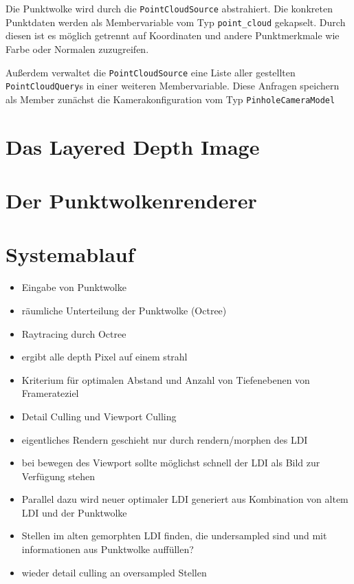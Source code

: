 \documentclass[hyperref, beleg, german]{cgvpub}
\begin{document}
Die Punktwolke wird durch die \texttt{PointCloudSource} abstrahiert. Die
konkreten Punktdaten werden als Membervariable vom Typ \texttt{point\_cloud}
gekapselt. Durch diesen ist es möglich getrennt auf Koordinaten und andere
Punktmerkmale wie Farbe oder Normalen zuzugreifen.

Außerdem verwaltet die \texttt{PointCloudSource} eine Liste aller gestellten
\texttt{PointCloudQuery}s in einer weiteren Membervariable. Diese Anfragen
speichern als Member zunächst die Kamerakonfiguration vom Typ
\texttt{PinholeCameraModel}

\section{Das Layered Depth Image}

\section{Der Punktwolkenrenderer}

\section{Systemablauf}

\begin{itemize}
\item Eingabe von Punktwolke
\item räumliche Unterteilung der Punktwolke (Octree)
\item Raytracing durch Octree
\item ergibt alle depth Pixel auf einem strahl
\item Kriterium für optimalen Abstand und Anzahl von Tiefenebenen von Framerateziel
\item Detail Culling und Viewport Culling
\item eigentliches Rendern geschieht nur durch rendern/morphen des LDI
\item bei bewegen des Viewport sollte möglichst schnell der LDI als Bild zur Verfügung stehen
\item Parallel dazu wird neuer optimaler LDI generiert aus Kombination von altem LDI und der Punktwolke
\item Stellen im alten gemorphten LDI finden, die undersampled sind und mit informationen aus Punktwolke auffüllen?
\item wieder detail culling an oversampled Stellen
\end{itemize}
\end{document}
